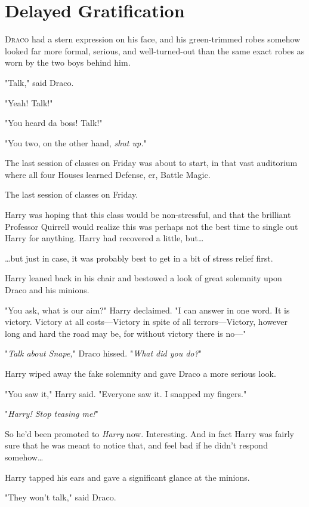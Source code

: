 \chapter{Delayed Gratification}

\lettrine{D}{raco} had a stern expression on his face, and his green-trimmed robes somehow 
looked far more formal, serious, and well-turned-out than the same exact robes 
as worn by the two boys behind him.

"Talk," said Draco.

"Yeah! Talk!"

"You heard da boss! Talk!"

"You two, on the other hand, \emph{shut up.}"

The last session of classes on Friday was about to start, in that vast 
auditorium where all four Houses learned Defense, er, Battle Magic.

The last session of classes on Friday.

Harry was hoping that this class would be non-stressful, and that the brilliant 
Professor Quirrell would realize this was perhaps not the best time to single 
out Harry for anything. Harry had recovered a little, but{\ldots}

{\ldots}but just in case, it was probably best to get in a bit of stress relief 
first.

Harry leaned back in his chair and bestowed a look of great solemnity upon 
Draco and his minions.

"You ask, what is our aim?" Harry declaimed. "I can answer in one word. It is 
victory. Victory at all costs---Victory in spite of all terrors---Victory, 
however long and hard the road may be, for without victory there is no---"

"\emph{Talk about Snape,}" Draco hissed. "\emph{What did you do?}"

Harry wiped away the fake solemnity and gave Draco a more serious look.

"You saw it," Harry said. "Everyone saw it. I snapped my fingers."

"\emph{Harry! Stop teasing me!}"

So he'd been promoted to \emph{Harry} now. Interesting. And in fact Harry was 
fairly sure that he was meant to notice that, and feel bad if he didn't respond 
somehow{\ldots}

Harry tapped his ears and gave a significant glance at the minions.

"They won't talk," said Draco.

